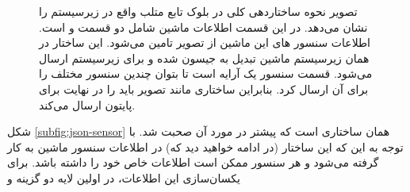 \begin{figure}[h!]
{   		\label{subfig:json-total}
  	}
  	\caption[ساختار جیسون برای بلوک های سیمولینک]{%
  		تصویر
  	نحوه ساختار‌دهی کلی در بلوک تابع متلب واقع در زیرسیستم 
	را نشان می‌دهد. در این قسمت اطلاعات ماشین شامل دو قسمت  و  است. اطلاعات سنسور های این ماشین  از تصویر  تامین می‌شود. این ساختار در همان زیرسیستم ماشین تبدیل به جیسون شده و برای زیر‌سیستم  ارسال می‌شود. قسمت سنسور یک آرایه است تا بتوان چندین سنسور مختلف را برای آن ارسال کرد. بنابراین ساختاری مانند تصویر  باید را در نهایت برای پایتون ارسال می‌کند.
  	}
  	\label{fig:json-total}
\end{figure}

شکل \ref{subfig:json-sensor} همان ساختاری است که پیشتر در مورد آن صحبت شد. با توجه به این که این ساختار (در ادامه خواهید دید که) در اطلاعات سنسور ماشین به کار گرفته می‌شود و هر سنسور ممکن است اطلاعات خاص خود را داشته باشد. برای یکسان‌سازی این اطلاعات، در اولین لایه دو گزینه  و 





   

%
%






